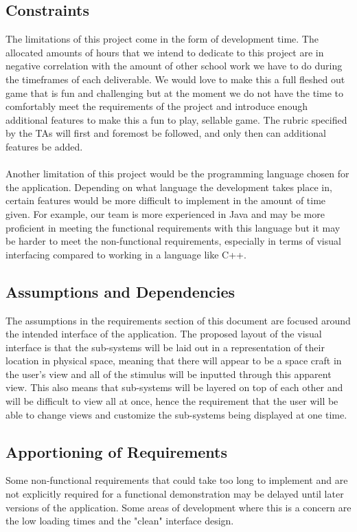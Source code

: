 \documentclass[12pt, titlepage]{article}
\newcommand\tab[1][1cm]{\hspace*{#1}}
\begin{document}
\subsection{Constraints}
\tab The limitations of this project come in the form of development time. The allocated amounts of hours that we intend to dedicate to this project are in negative correlation with the amount of other school work we have to do during the timeframes of each deliverable. We would love to make this a full fleshed out game that is fun and challenging but at the moment we do not have the time to comfortably meet the requirements of the project and introduce enough additional features to make this a fun to play, sellable game. The rubric specified by the TAs will first and foremost be followed, and only then can additional features be added. \\
\\ \tab Another limitation of this project would be the programming language chosen for the application. Depending on what language the development takes place in, certain features would be more difficult to implement in the amount of time given. For example, our team is more experienced in Java and may be more proficient in meeting the functional requirements with this language but it may be harder to meet the non-functional requirements, especially in terms of visual interfacing compared to working in a language like C++.

\subsection{Assumptions and Dependencies}
\tab The assumptions in the requirements section of this document are focused around the intended interface of the application. The proposed layout of the visual interface is that the sub-systems will be laid out in a representation of their location in physical space, meaning that there will appear to be a space craft in the user's view and all of the stimulus will be inputted through this apparent view. This also means that sub-systems will be layered on top of each other and will be difficult to view all at once, hence the requirement that the user will be able to change views and customize the sub-systems being displayed at one time.

\subsection{Apportioning of Requirements}
\tab Some non-functional requirements that could take too long to implement and are not explicitly required for a functional demonstration may be delayed until later versions of the application. Some areas of development where this is a concern are the low loading times and the "clean" interface design.
\end{document}
